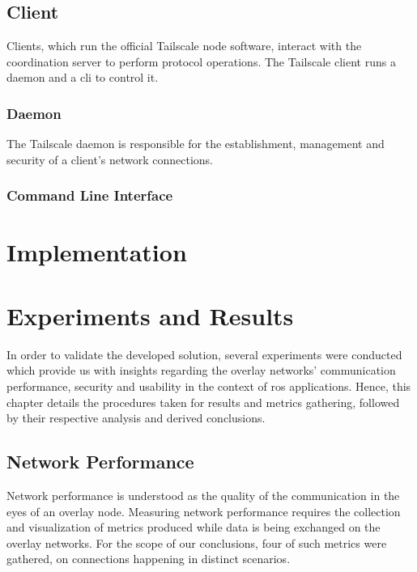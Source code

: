 \documentclass[11pt,twoside,a4paper]{report}
\begin{document}
\section{Client}

Clients, which run the official Tailscale node software, interact with the coordination server to perform protocol operations. The Tailscale client runs a daemon and a \ac{cli} to control it.

\subsection{Daemon}

The Tailscale daemon is responsible for the establishment, management and security of a client's network connections.

\subsection{Command Line Interface}


\chapter{Implementation}

\chapter{Experiments and Results}
\label{chap:results}

In order to validate the developed solution, several experiments were conducted which provide us with insights regarding the overlay networks' communication performance, security and usability in the context of \ac{ros} applications. Hence, this chapter details the procedures taken for results and metrics gathering, followed by their respective analysis and derived conclusions.

\section{Network Performance}

Network performance is understood as the quality of the communication in the eyes of an overlay node. Measuring network performance requires the collection  and visualization of metrics produced while data is being exchanged on the overlay networks. For the scope of our conclusions, four of such metrics were gathered, on connections happening in distinct scenarios.
\end{document}
